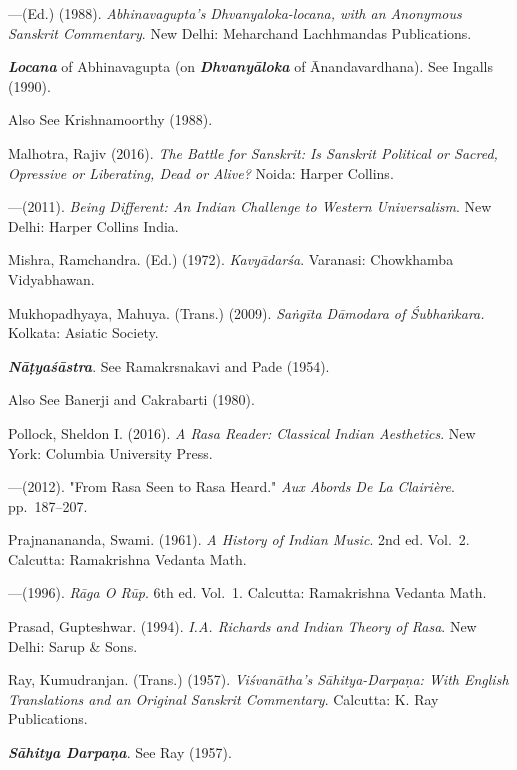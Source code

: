 \begin{thebibliography}{99}
---\kern3pt(Ed.) (1988). \textsl{Abhinavagupta's Dhvanyaloka-locana, with an Anonymous Sanskrit Commentary}. New Delhi: Meharchand Lachhmandas Publications. 

{\sl\bfseries Locana} of Abhinavagupta (on {\sl\bfseries Dhvanyāloka} of Ānandavardhana). See Ingalls (1990). 

Also See Krishnamoorthy (1988).

Malhotra, Rajiv (2016). \textsl{The Battle for Sanskrit: Is Sanskrit Political or Sacred, Opressive or Liberating, Dead or Alive?} Noida: Harper Collins.

---\kern3pt(2011). \textsl{Being Different: An Indian Challenge to Western Universalism}. New Delhi: Harper Collins India. 

Mishra, Ramchandra. (Ed.) (1972). \textsl{Kavyādarśa}. Varanasi: Chowkhamba Vidyabhawan.

Mukhopadhyaya, Mahuya. (Trans.) (2009). \textsl{Saṅgīta Dāmodara of Śubhaṅkara.} Kolkata: Asiatic Society. 

{\sl\bfseries Nāṭyaśāstra}. See Ramakrsnakavi and Pade (1954).


Also See Banerji and Cakrabarti (1980).

Pollock, Sheldon I. (2016). \textsl{A Rasa Reader: Classical Indian Aesthetics}. New York: Columbia University Press. 

---\kern3pt(2012). "From Rasa Seen to Rasa Heard." \textsl{Aux Abords De La Clairière}. pp.~187--207. 

Prajnanananda, Swami. (1961). \textsl{A History of Indian Music}. 2nd ed. Vol.~2. Calcutta: Ramakrishna Vedanta Math. 

---\kern3pt(1996). \textsl{Rāga O Rūp}. 6th ed. Vol.~1. Calcutta: Ramakrishna Vedanta Math. 

Prasad, Gupteshwar. (1994). \textsl{I.A. Richards and Indian Theory of Rasa}. New Delhi: Sarup \& Sons.

Ray, Kumudranjan. (Trans.) (1957). \textsl{Viśvanātha's Sāhitya-Darpaṇa: With English Translations and an Original Sanskrit Commentary}. Calcutta: K. Ray Publications. 

{\sl\bfseries Sāhitya Darpaṇa}. See Ray (1957).


\end{thebibliography}
